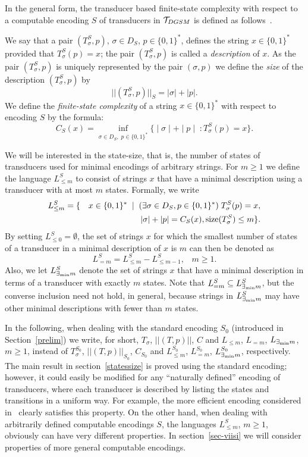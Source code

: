 \documentclass[copyright]{eptcs}
\begin{document}
In the general form, the
transducer based finite-state complexity with respect
to a computable encoding $S$ of transducers in ${\cal T}_{DGSM}$
is defined as follows~\cite{CSR}.

We say that a pair $(T_{\sigma}^{S}, p)$, $\sigma \in D_S$, 
$p \in \{0,1\}^*$, 
defines
the string $x \in \{ 0, 1 \}^*$ provided that
$T_{\sigma}^{S}(p)=x$; the pair $(T_{\sigma}^{S}, p)$ is called a 
{\it description} of $x$.
As  the pair $(T_{\sigma}^{S}, p)$ is uniquely represented by 
the pair $(\sigma, p)$ we
define the {\em  size\/} 
of the description $(T_{\sigma}^{S}, p)$   by
$$||(T_{\sigma}^{S}, p)||_{S} = |\sigma| + |p|.$$
We define the {\em finite-state complexity} of a string 
$x \in \{ 0, 1 \}^*$
 with respect
to encoding $S$   by the formula:
$$
C_{S}(x) =    \inf_{\sigma \in D_S, \; p \in \{ 0, 1
\}^* } \Big\lbrace  \mid \sigma \mid + \mid p \mid \; : 
T_\sigma^{S} (p) = x \Big\rbrace.
$$

We will be interested in the state-size,
that is, the number of states of transducers
used for minimal encodings of arbitrary  strings.
For $m \geq 1$ we define the language $L^{S}_{\leq m}$ to consist of
strings $x$ that have a minimal description using a transducer with
at most $m$ states. Formally, we write
\begin{eqnarray*}
L^{S}_{\leq m} & =  \{ & x \in \{ 0, 1 \}^* \; \mid \;
(\exists \sigma \in D_S, p \in \{ 0, 1 \}^*) \;
T_\sigma^S(p) = x,\\
& &   |\sigma| + |p| = C_S(x),
{\rm size}(T_\sigma^S) \leq m \}.
\end{eqnarray*}
By setting $L^{S}_{ \leq 0} = \emptyset$,
the set of strings $x$ for which the
smallest number of states  of a transducer
in a minimal description of $x$ 
is  $m$ can 
then be denoted as
$$
L^{S}_{= m}  = L^{S}_{\leq m} - L^{S}_{\leq m-1}, \;\;\; m \geq 1.
$$
Also, we let $L^S_{\exists_{\rm min} m}$ denote
the set of strings $x$ that have a minimal description
in terms of a transducer with exactly $m$ states. 
Note that $L^{S}_{= m} \subseteq L^S_{\exists_{\rm min} m}$, but
the converse inclusion need not hold, in general, because
strings in $L^S_{\exists_{\rm min} m}$ may have other minimal
descriptions with fewer than $m$ states.

In the following,
when dealing with the standard
encoding $S_0$ (introduced in Section~\ref{prelim}) 
we write, for short, $T_\sigma$, $||(T,p)||$,
$C$ and $L_{\leq m}$,
$L_{= m}$, $L_{\exists_{\rm min} m}$,
$m \geq 1$,  instead
of $T^{S_0}_\sigma$, $||(T,p)||_{S_0}$,
$C_{S_0}$ and $L^{S_0}_{ \leq m}$,
$L^{S_0}_{ = m}$, $L^{S_0}_{\exists_{\rm min} m}$, respectively.
The main result in section~\ref{statessize} is proved using
the standard encoding; however, it   could easily be
modified  for any 
``naturally defined'' encoding of transducers,  
where each transducer is described by listing the states and transitions
in a uniform way. 
For example, the more efficient encoding considered in~\cite{CSR}
clearly satisfies this property. On the other hand, 
when dealing with arbitrarily defined computable encodings $S$,
the languages $L^{S}_{ \leq m}$, $m \geq 1$, obviously can have
very different properties. In  section~\ref{sec-viisi}
we will  consider properties of  more
general computable encodings.
\end{document}
